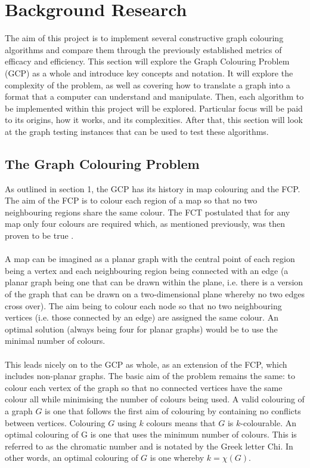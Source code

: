 \section{Background Research}
The aim of this project is to implement several constructive graph colouring algorithms and compare them through the previously established metrics of efficacy and efficiency. This section will explore the Graph Colouring Problem (GCP) as a whole and introduce key concepts and notation. It will explore the complexity of the problem, as well as covering how to translate a graph into a format that a computer can understand and manipulate. Then, each algorithm to be implemented within this project will be explored. Particular focus will be paid to its origins, how it works, and its complexities. After that, this section will look at the graph testing instances that can be used to test these algorithms.


\subsection{The Graph Colouring Problem}
As outlined in section 1, the GCP has its history in map colouring and the FCP. The aim of the FCP is to colour each region of a map so that no two neighbouring regions share the same colour. The FCT postulated that for any map only four colours are required which, as mentioned previously, was then proven to be true \cite{AppelHaken4Colour}. 
\\\\
A map can be imagined as a planar graph with the central point of each region being a vertex and each neighbouring region being connected with an edge (a planar graph being one that can be drawn within the plane, i.e. there is a version of the graph that can be drawn on a two-dimensional plane whereby no two edges cross over). The aim being to colour each node so that no two neighbouring vertices (i.e. those connected by an edge) are assigned the same colour. An optimal solution (always being four for planar graphs) would be to use the minimal number of colours.
\\ \\
This leads nicely on to the GCP as whole, as an extension of the FCP, which includes non-planar graphs. The basic aim of the problem remains the same: to colour each vertex of the graph so that no connected vertices have the same colour all while minimising the number of colours being used. A valid colouring of a graph $G$ is one that follows the first aim of colouring by containing no conflicts between vertices. Colouring $G$ using $k$ colours means that $G$ is $k$-colourable. An optimal colouring of G is one that uses the minimum number of colours. This is referred to as the chromatic number and is notated by the Greek letter Chi. In other words, an optimal colouring of $G$ is one whereby $k = \chi(G)$.


